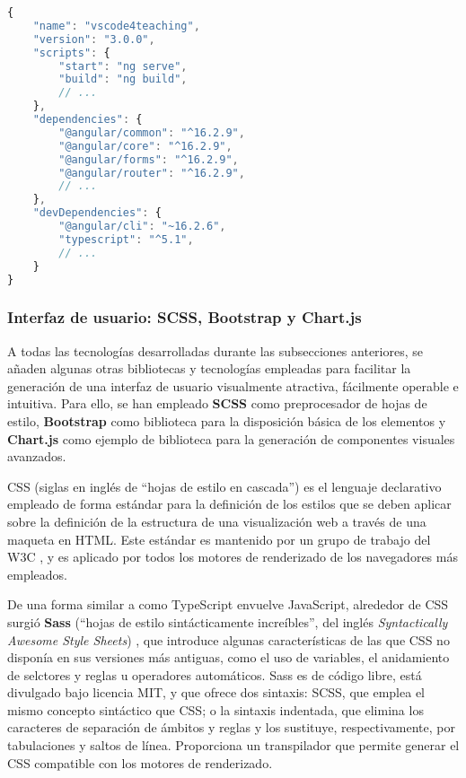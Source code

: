 \begin{lstlisting}[language=JavaScript,caption={Fragmento del documento \texttt{package.json} de la aplicación web Angular.},label=cod:packageJsonAngular]
{
    "name": "vscode4teaching",
    "version": "3.0.0",
    "scripts": {
        "start": "ng serve",
        "build": "ng build",
        // ...
    },
    "dependencies": {
        "@angular/common": "^16.2.9",
        "@angular/core": "^16.2.9",
        "@angular/forms": "^16.2.9",
        "@angular/router": "^16.2.9",
        // ...
    },
    "devDependencies": {
        "@angular/cli": "~16.2.6",
        "typescript": "^5.1",
        // ...
    }
}
\end{lstlisting}

\subsubsection{Interfaz de usuario: SCSS, Bootstrap y Chart.js}
\label{subsec:tecGUI}
A todas las tecnologías desarrolladas durante las subsecciones anteriores, se añaden algunas otras bibliotecas y tecnologías empleadas para facilitar la generación de una interfaz de usuario visualmente atractiva, fácilmente operable e intuitiva. Para ello, se han empleado \textbf{SCSS} como preprocesador de hojas de estilo, \textbf{Bootstrap} como biblioteca para la disposición básica de los elementos y \textbf{Chart.js} como ejemplo de biblioteca para la generación de componentes visuales avanzados.

CSS (siglas en inglés de ``hojas de estilo en cascada'') es el lenguaje declarativo empleado de forma estándar para la definición de los estilos que se deben aplicar sobre la definición de la estructura de una visualización web a través de una maqueta en HTML. Este estándar es mantenido por un grupo de trabajo del W3C \cite{CSS_W3C}, y es aplicado por todos los motores de renderizado de los navegadores más empleados.

De una forma similar a como TypeScript envuelve JavaScript, alrededor de CSS surgió \textbf{Sass} (``hojas de estilo sintácticamente increíbles'', del inglés \textit{Syntactically Awesome Style Sheets}) \cite{Sass}, que introduce algunas características de las que CSS no disponía en sus versiones más antiguas, como el uso de variables, el anidamiento de selctores y reglas u operadores automáticos. Sass es de código libre, está divulgado bajo licencia MIT, y que ofrece dos sintaxis: SCSS, que emplea el mismo concepto sintáctico que CSS; o la sintaxis indentada, que elimina los caracteres de separación de ámbitos y reglas y los sustituye, respectivamente, por tabulaciones y saltos de línea. Proporciona un transpilador que permite generar el CSS compatible con los motores de renderizado.  

